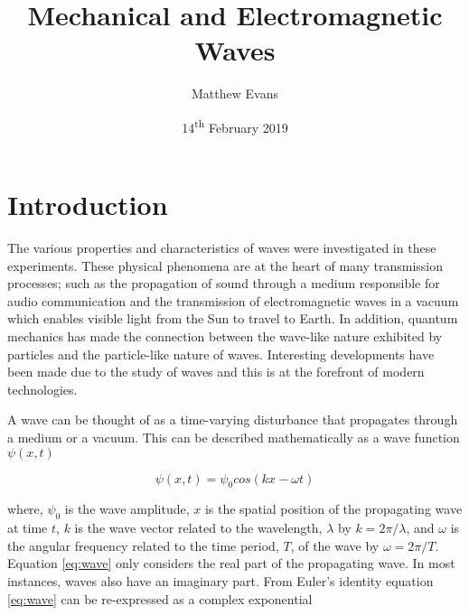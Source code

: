 \documentclass{article}
\begin{document}
\title{Mechanical and Electromagnetic Waves} %
\author{Matthew Evans}%
\date{14\textsuperscript{th} February 2019} %
\maketitle %



\section{Introduction}
\label{sec:introduction}

The various properties and characteristics of waves were investigated in these experiments. These physical phenomena are at the heart of many transmission processes; such as the propagation of sound through a medium responsible for audio communication and the transmission of electromagnetic waves in a vacuum which enables visible light from the Sun to travel to Earth. In addition, quantum mechanics has made the connection between the wave-like nature exhibited by particles and the particle-like nature of waves. Interesting developments have been made due to the study of waves and this is at the forefront of modern technologies.

\vspace{2mm}
\noindent
A wave can be thought of as a time-varying disturbance that propagates through a medium or a vacuum. This can be described mathematically as a wave function $\psi(x, t)$

\begin{equation}
\label{eq:wave}
\psi(x, t) = \psi_0 cos(kx - \omega t)
\end{equation}

\vspace{2mm}
\noindent
where, $\psi_0$ is the wave amplitude, $x$ is the spatial position of the propagating wave at time $t$, $k$ is the wave vector related to the wavelength, $\lambda$ by $k = 2\pi / {\lambda}$, and $\omega$ is the angular frequency related to the time period, $T$, of the wave by $\omega = {2\pi} / {T}$. Equation \eqref{eq:wave} only considers the real part of the propagating wave. In most instances, waves also have an imaginary part. From Euler's identity equation \eqref{eq:wave} can be re-expressed as a complex exponential
\end{document}
